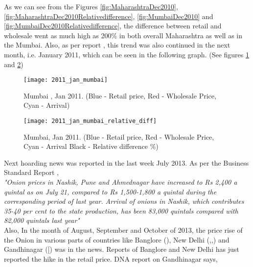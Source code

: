 As we can see from the Figures \ref{fig:MaharashtraDec2010}, \ref{fig:MaharashtraDec2010Relativedifference}, \ref{fig:MumbaiDec2010} and \ref{fig:MumbaiDec2010Relativedifference}, the difference between retail and wholesale went as much high as 200\% in both overall Maharashtra as well as in the Mumbai. Also, as per report \cite{Theg88:online}, this trend was also continued in the next month, i.e. January 2011, which can be seen in the following graph. (See figures \ref{fig:MumbaiJan2011} and \ref{fig:MumbaiJan2011Relativediff}) \\

\begin{figure}[h]
\begin{center}    
\texttt{[image: 2011\_jan\_mumbai]}
\caption{Mumbai , Jan 2011. (Blue - Retail price, Red - Wholesale Price, Cyan - Arrival)}
\label{fig:MumbaiJan2011}
\end{center}
\end{figure}

\begin{figure}[h]
\begin{center}    
\texttt{[image: 2011\_jan\_mumbai\_relative\_diff]}
\caption{Mumbai, Jan 2011. (Blue - Retail price, Red - Wholesale Price, Cyan - Arrival Black - Relative difference \%)}
\label{fig:MumbaiJan2011Relativediff}
\end{center}
\end{figure}

Next hoarding news was reported in the last week July 2013. As per the Business Standard Report \cite{Flyin19:online},\\

\textit{"Onion prices in Nashik, Pune and Ahmednagar have increased to Rs 2,400 a quintal as on July 21, compared to Rs 1,500-1,800 a quintal during the corresponding period of last year. Arrival of onions in Nashik, which contributes 35-40 per cent to the state production, has been 83,000 quintals compared with 82,000 quintals last year"}\\

Also, In the month of August, September and October of 2013, the price rise of the Onion in various parts of countries like Banglore (\cite{Onion55:online}), New Delhi (\cite{Hoard62:online},\cite{Onion85:online},\cite{Noon17:online}) and Gandhinagar ([\cite{Govt81:online}) was in the news. Reports of Banglore and New Delhi has just reported the hike in the retail price. DNA report on Gandhinagar says,\\

